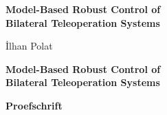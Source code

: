 
\newcommand{\thetitle}{Model-Based Robust Control of \\[2mm] Bilateral Teleoperation Systems}
\newcommand{\thesubtitle}{}
\renewcommand{\theauthor}{İlhan Polat}
\vspace*{30mm}

\thispagestyle{empty}
\begin{center}
    \textbf{\huge \thetitle}\\[\baselineskip]\textbf{\LARGE \thesubtitle}
\end{center}

\vspace{20mm}
\begin{center}
    \Large\theauthor
\end{center}
\newpage

\thispagestyle{empty}

%
\vspace*{\fill}{\tiny .}
%
\newpage
\thispagestyle{empty}
\vspace*{30mm}

\begin{center}
     \textbf{\huge \thetitle}
\end{center}

\vspace{30mm}

\begin{center}
    \textbf{Proefschrift}
\end{center}

